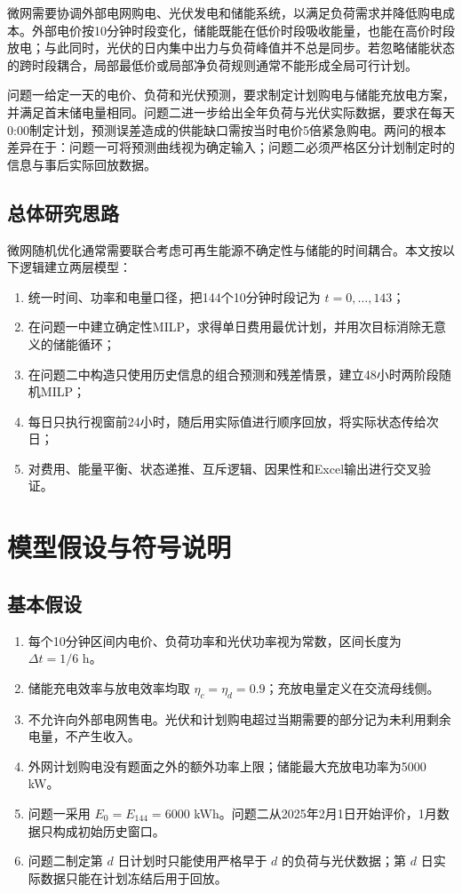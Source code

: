 \documentclass[UTF8,12pt,a4paper]{ctexart}
\begin{document}
微网需要协调外部电网购电、光伏发电和储能系统，以满足负荷需求并降低购电成本。外部电价按10分钟时段变化，储能既能在低价时段吸收能量，也能在高价时段放电；与此同时，光伏的日内集中出力与负荷峰值并不总是同步。若忽略储能状态的跨时段耦合，局部最低价或局部净负荷规则通常不能形成全局可行计划。

问题一给定一天的电价、负荷和光伏预测，要求制定计划购电与储能充放电方案，并满足首末储电量相同。问题二进一步给出全年负荷与光伏实际数据，要求在每天0:00制定计划，预测误差造成的供能缺口需按当时电价5倍紧急购电。两问的根本差异在于：问题一可将预测曲线视为确定输入；问题二必须严格区分计划制定时的信息与事后实际回放数据。

\subsection{总体研究思路}

微网随机优化通常需要联合考虑可再生能源不确定性与储能的时间耦合\cite{liang2014stochastic}。本文按以下逻辑建立两层模型：

\begin{enumerate}
  \item 统一时间、功率和电量口径，把144个10分钟时段记为 $t=0,\ldots,143$；
  \item 在问题一中建立确定性MILP，求得单日费用最优计划，并用次目标消除无意义的储能循环；
  \item 在问题二中构造只使用历史信息的组合预测和残差情景，建立48小时两阶段随机MILP；
  \item 每日只执行视窗前24小时，随后用实际值进行顺序回放，将实际状态传给次日；
  \item 对费用、能量平衡、状态递推、互斥逻辑、因果性和Excel输出进行交叉验证。
\end{enumerate}

\section{模型假设与符号说明}

\subsection{基本假设}

\begin{enumerate}
  \item 每个10分钟区间内电价、负荷功率和光伏功率视为常数，区间长度为 $\Delta t=1/6$ h。
  \item 储能充电效率与放电效率均取 $\eta_c=\eta_d=0.9$；充放电量定义在交流母线侧。
  \item 不允许向外部电网售电。光伏和计划购电超过当期需要的部分记为未利用剩余电量，不产生收入。
  \item 外网计划购电没有题面之外的额外功率上限；储能最大充放电功率为5000 kW。
  \item 问题一采用 $E_0=E_{144}=6000$ kWh。问题二从2025年2月1日开始评价，1月数据只构成初始历史窗口。
  \item 问题二制定第 $d$ 日计划时只能使用严格早于 $d$ 的负荷与光伏数据；第 $d$ 日实际数据只能在计划冻结后用于回放。
\end{enumerate}
\end{document}
